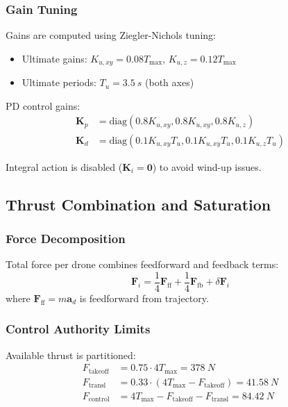 \documentclass[12pt,a4paper]{article}
\begin{document}
\subsubsection{Gain Tuning}
Gains are computed using Ziegler-Nichols tuning:
\begin{itemize}
    \item Ultimate gains: $K_{u,xy} = 0.08 T_{\max}$, $K_{u,z} = 0.12 T_{\max}$
    \item Ultimate periods: $T_{u} = \SI{3.5}{s}$ (both axes)
\end{itemize}

PD control gains:
\begin{align}
    \mathbf{K}_p &= \text{diag}(0.8 K_{u,xy}, 0.8 K_{u,xy}, 0.8 K_{u,z}) \\
    \mathbf{K}_d &= \text{diag}(0.1 K_{u,xy}T_{u}, 0.1 K_{u,xy}T_{u}, 0.1 K_{u,z}T_{u})
\end{align}

Integral action is disabled ($\mathbf{K}_i = \mathbf{0}$) to avoid wind-up issues.

\subsection{Thrust Combination and Saturation}

\subsubsection{Force Decomposition}
Total force per drone combines feedforward and feedback terms:
\begin{equation}
    \mathbf{F}_i = \frac{1}{4}\mathbf{F}_{\text{ff}} + \frac{1}{4}\mathbf{F}_{\text{fb}} + \delta\mathbf{F}_i
    \label{eq:total_force}
\end{equation}
where $\mathbf{F}_{\text{ff}} = m\mathbf{a}_d$ is feedforward from trajectory.

\subsubsection{Control Authority Limits}
Available thrust is partitioned:
\begin{align}
    F_{\text{takeoff}} &= 0.75 \cdot 4T_{\max} = \SI{378}{N} \\
    F_{\text{transl}} &= 0.33 \cdot (4T_{\max} - F_{\text{takeoff}}) = \SI{41.58}{N} \\
    F_{\text{control}} &= 4T_{\max} - F_{\text{takeoff}} - F_{\text{transl}} = \SI{84.42}{N}
\end{align}
\end{document}
